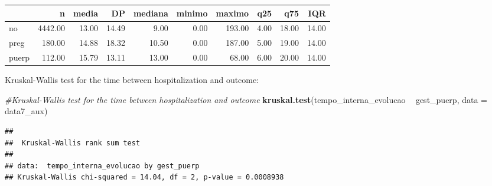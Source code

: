 \documentclass[
]{article}
\newenvironment{Shaded}{\begin{snugshade}}{\end{snugshade}}
\newcommand{\CommentTok}[1]{\textcolor[rgb]{0.56,0.35,0.01}{\textit{#1}}}
\newcommand{\DataTypeTok}[1]{\textcolor[rgb]{0.13,0.29,0.53}{#1}}
\newcommand{\KeywordTok}[1]{\textcolor[rgb]{0.13,0.29,0.53}{\textbf{#1}}}
\newcommand{\NormalTok}[1]{#1}
\newcommand{\OperatorTok}[1]{\textcolor[rgb]{0.81,0.36,0.00}{\textbf{#1}}}
\newcommand{\StringTok}[1]{\textcolor[rgb]{0.31,0.60,0.02}{#1}}
\begin{document}
\begin{Shaded}
\end{Shaded}

\begin{longtable}[]{@{}lrrrrrrrrr@{}}
\toprule
& n & media & DP & mediana & minimo & maximo & q25 & q75 &
IQR\tabularnewline
\midrule
\endhead
no & 4442.00 & 13.00 & 14.49 & 9.00 & 0.00 & 193.00 & 4.00 & 18.00 &
14.00\tabularnewline
preg & 180.00 & 14.88 & 18.32 & 10.50 & 0.00 & 187.00 & 5.00 & 19.00 &
14.00\tabularnewline
puerp & 112.00 & 15.79 & 13.11 & 13.00 & 0.00 & 68.00 & 6.00 & 20.00 &
14.00\tabularnewline
\bottomrule
\end{longtable}

Kruskal-Wallis test for the time between hospitalization and outcome:

\begin{Shaded}
\begin{Highlighting}[]
\CommentTok{#Kruskal-Wallis test for the time between hospitalization and outcome}
\KeywordTok{kruskal.test}\NormalTok{(tempo_interna_evolucao }\OperatorTok{~}\StringTok{ }\NormalTok{gest_puerp,}
             \DataTypeTok{data =}\NormalTok{ data7_aux)}
\end{Highlighting}
\end{Shaded}

\begin{verbatim}
## 
##  Kruskal-Wallis rank sum test
## 
## data:  tempo_interna_evolucao by gest_puerp
## Kruskal-Wallis chi-squared = 14.04, df = 2, p-value = 0.0008938
\end{verbatim}
\end{document}
